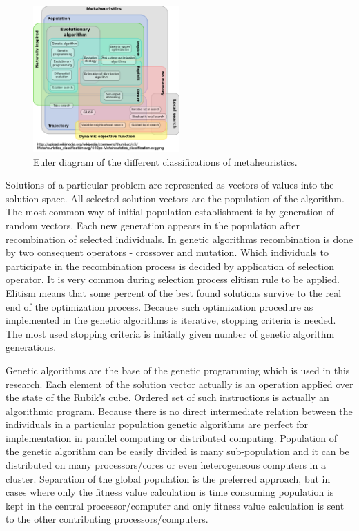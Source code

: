 \documentclass[runningheads]{llncs}
\begin{document}
\begin{figure}
\includegraphics[width=0.5\textwidth]{fig02.png}
\centering
\caption{Euler diagram of the different classifications of metaheuristics.} \label{fig02}
\end{figure}
\FloatBarrier

Solutions of a particular problem are represented as vectors of values into the solution space. All selected solution vectors are the population of the algorithm. The most common way of initial population establishment is by generation of random vectors. Each new generation appears in the population after recombination of selected individuals. In genetic algorithms recombination is done by two consequent operators - crossover and mutation. Which individuals to participate in the recombination process is decided by application of selection operator. It is very common during selection process elitism rule to be applied. Elitism means that some percent of the best found solutions survive to the real end of the optimization process. Because such optimization procedure as implemented in the genetic algorithms is iterative, stopping criteria is needed. The most used stopping criteria is initially given number of genetic algorithm generations. 

Genetic algorithms are the base of the genetic programming which is used in this research. Each element of the solution vector actually is an operation applied over the state of the Rubik's cube. Ordered set of such instructions is actually an algorithmic program. Because there is no direct intermediate relation between the individuals in a particular population genetic algorithms are perfect for implementation in parallel computing or distributed computing. Population of the genetic algorithm can be easily divided is many sub-population and it can be distributed on many processors/cores or even heterogeneous computers in a cluster. Separation of the global population is the preferred approach, but in cases where only the fitness value calculation is time consuming population is kept in the central processor/computer and only fitness value calculation is sent to the other contributing processors/computers. 
\end{document}
